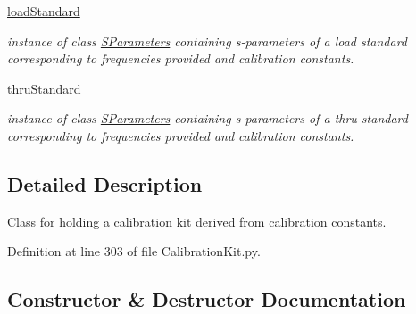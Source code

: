 \begin{DoxyCompactItemize}
\hyperlink{classSignalIntegrity_1_1Measurement_1_1CalKit_1_1CalibrationKit_1_1CalibrationKit_af4b585ef48fed700d70b2bee7e5ffdbe}{load\+Standard}
\begin{DoxyCompactList}\small\item\em instance of class \hyperlink{namespaceSignalIntegrity_1_1SParameters}{S\+Parameters} containing s-\/parameters of a load standard corresponding to frequencies provided and calibration constants. \end{DoxyCompactList}\item 
\hyperlink{classSignalIntegrity_1_1Measurement_1_1CalKit_1_1CalibrationKit_1_1CalibrationKit_a63691e31dc0a91dbcfe40635f9c87599}{thru\+Standard}
\begin{DoxyCompactList}\small\item\em instance of class \hyperlink{namespaceSignalIntegrity_1_1SParameters}{S\+Parameters} containing s-\/parameters of a thru standard corresponding to frequencies provided and calibration constants. \end{DoxyCompactList}\end{DoxyCompactItemize}


\subsection{Detailed Description}
Class for holding a calibration kit derived from calibration constants. 

Definition at line 303 of file Calibration\+Kit.\+py.



\subsection{Constructor \& Destructor Documentation}
\mbox{\label{classSignalIntegrity_1_1Measurement_1_1CalKit_1_1CalibrationKit_1_1CalibrationKit_a7c969c556643c62769436aaee9bee342}} 
